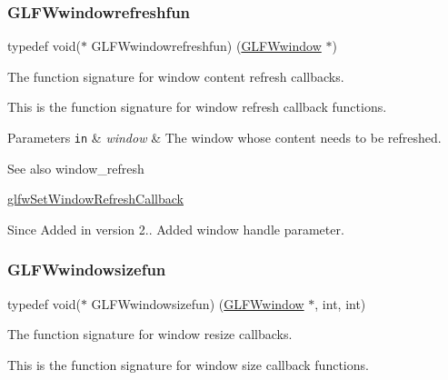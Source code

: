 \subsubsection{\texorpdfstring{G\+L\+F\+Wwindowrefreshfun}{GLFWwindowrefreshfun}\hspace{0.1cm}{\footnotesize\ttfamily [5/5]}}
{\footnotesize\ttfamily typedef void($\ast$  G\+L\+F\+Wwindowrefreshfun) (\hyperlink{group__window_ga3c96d80d363e67d13a41b5d1821f3242}{G\+L\+F\+Wwindow} $\ast$)}



The function signature for window content refresh callbacks. 

This is the function signature for window refresh callback functions.


\begin{DoxyParams}[1]{Parameters}
\mbox{\tt in}  & {\em window} & The window whose content needs to be refreshed.\\
\hline
\end{DoxyParams}
\begin{DoxySeeAlso}{See also}
window\+\_\+refresh 

\hyperlink{group__window_ga9d2621fbc271a0cdc0ce91f9749f46e3}{glfw\+Set\+Window\+Refresh\+Callback}
\end{DoxySeeAlso}
\begin{DoxySince}{Since}
Added in version 2..  Added window handle parameter. 
\end{DoxySince}
\mbox{\label{group__window_gae49ee6ebc03fa2da024b89943a331355}} 
\subsubsection{\texorpdfstring{G\+L\+F\+Wwindowsizefun}{GLFWwindowsizefun}\hspace{0.1cm}{\footnotesize\ttfamily [1/5]}}
{\footnotesize\ttfamily typedef void($\ast$  G\+L\+F\+Wwindowsizefun) (\hyperlink{group__window_ga3c96d80d363e67d13a41b5d1821f3242}{G\+L\+F\+Wwindow} $\ast$, int, int)}



The function signature for window resize callbacks. 

This is the function signature for window size callback functions.


